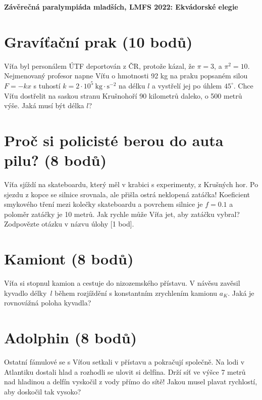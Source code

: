 \documentclass[10pt,a4paper,landscape]{article}
\author{Ondřej Zelenka}
\begin{document}
\pagestyle{empty}
\textbf{\center\LARGE Závěrečná paralympiáda mladších, LMFS 2022: Ekvádorské elegie}

\begin{multicols}{2}[]

\section{Gravíťační prak (10 bodů)}
Víťa byl personálem ÚTF deportován z ČR, protože kázal, že $\pi=3$, a $\pi^2=10$. Nejmenovaný profesor napne Víťu o hmotnosti 92 kg na praku popsaném silou $F = -kx$ s tuhostí $k = 2\cdot 10^5 ~\mathrm{kg}\cdot\mathrm{s}^{-2}$ na délku $l$ a vystřelí jej po úhlem $45^\circ$. Chce Víťu dostřelit na saskou stranu Krušnohoří 90 kilometrů daleko, o 500 metrů výše. Jaká musí být délka $l$?


\section{Proč si policisté berou do auta pilu? (8 bodů)}
Víťa sjíždí na skateboardu, který měl v krabici s experimenty, z Krušných hor. Po sjezdu z kopce se silnice srovnala, ale přišla ostrá neklopená zatáčka! Koeficient smykového tření mezi kolečky skateboardu a povrchem silnice je $f=0.1$ a poloměr zatáčky je 10 metrů. Jak rychle může Víťa jet, aby zatáčku vybral? Zodpovězte otázku v názvu úlohy [1 bod].

\section{Kamiont (8 bodů)}\label{sec:kamion}
Víťa si stopnul kamion a cestuje do nizozemského přístavu. V návěsu zavěsil kyvadlo délky~$l$ během rozjíždění s konstantním zrychlením kamionu $a_K$. Jaká je rovnovážná poloha kyvadla?

\section{Adolphin (8 bodů)}
Ostatní fámulové se s Víťou setkali v přístavu a pokračují společně. Na lodi v Atlantiku dostali hlad a rozhodli se ulovit si delfína. Drží síť ve výšce 7 metrů nad hladinou a delfín vyskočil z vody přímo do sítě! Jakou musel plavat rychlostí, aby doskočil tak vysoko?


\end{multicols}
\end{document}
